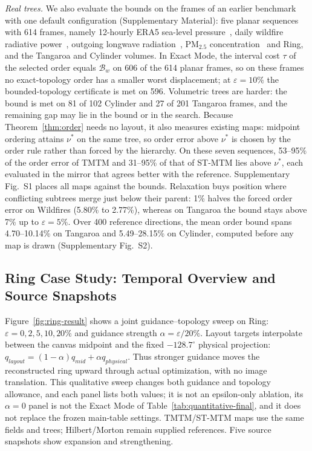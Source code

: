 \documentclass{vgtc}                %
\begin{document}
\emph{Real trees.} We also evaluate the bounds on the frames of an earlier benchmark with one default configuration (Supplementary Material): five planar sequences with 614 frames, namely 12-hourly ERA5 sea-level pressure~\cite{Hersbach:2020:ERA5}, daily wildfire radiative power~\cite{Franke:2021:1DP}, outgoing longwave radiation~\cite{NOAA:OLR}, PM$_{2.5}$ concentration~\cite{Dong:2026:PM25} and Ring, and the Tangaroa and Cylinder volumes. In Exact Mode, the interval cost $\tau$ of the selected order equals $\mathcal{B}_w$ on 606 of the 614 planar frames, so on these frames no exact-topology order has a smaller worst displacement; at $\varepsilon=10\%$ the bounded-topology certificate is met on 596. Volumetric trees are harder: the bound is met on 81 of 102 Cylinder and 27 of 201 Tangaroa frames, and the remaining gap may lie in the bound or in the search. Because Theorem~\ref{thm:order} needs no layout, it also measures existing maps: midpoint ordering attains $\nu^*$ on the same tree, so order error above $\nu^*$ is chosen by the order rule rather than forced by the hierarchy. On these seven sequences, 53--95\% of the order error of TMTM and 31--95\% of that of ST-MTM lies above $\nu^*$, each evaluated in the mirror that agrees better with the reference. Supplementary Fig.~S1 places all maps against the bounds. Relaxation buys position where conflicting subtrees merge just below their parent: 1\% halves the forced order error on Wildfires (5.80\% to 2.77\%), whereas on Tangaroa the bound stays above 7\% up to $\varepsilon=5\%$. Over 400 reference directions, the mean order bound spans 4.70--10.14\% on Tangaroa and 5.49--28.15\% on Cylinder, computed before any map is drawn (Supplementary Fig.~S2).

\subsection{Ring Case Study: Temporal Overview and Source Snapshots}

Figure~\ref{fig:ring-result} shows a joint guidance--topology sweep on Ring: $\varepsilon=0,2,5,10,20\%$ and guidance strength $\alpha=\varepsilon/20\%$. Layout targets interpolate between the canvas midpoint and the fixed $-128.7^\circ$ physical projection: $q_{layout}=(1-\alpha)q_{mid}+\alpha q_{physical}$. Thus stronger guidance moves the reconstructed ring upward through actual optimization, with no image translation. This qualitative sweep changes both guidance and topology allowance, and each panel lists both values; it is not an epsilon-only ablation, its $\alpha=0$ panel is not the Exact Mode of Table~\ref{tab:quantitative-final}, and it does not replace the frozen main-table settings. TMTM/ST-MTM maps use the same fields and trees; Hilbert/Morton remain supplied references. Five source snapshots show expansion and strengthening.
\end{document}
